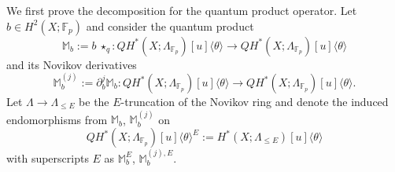 \documentclass[reqno]{amsart}
\numberwithin{equation}{section}
\numberwithin{equation}{section}
\numberwithin{equation}{section}
\theoremstyle{definition}
\theoremstyle{remark}
\theoremstyle{remark}
\begin{document}
We first prove the decomposition for the quantum product operator.  Let $b \in H^2(X;\mathbb{F}_p)$ and consider the quantum product
    \begin{equation}
        \mathbb{M}_b := b \ \star_q : QH^*(X;\Lambda_{\mathbb{F}_p})[u]\langle \theta \rangle \to QH^*(X;\Lambda_{\mathbb{F}_p})[u]\langle \theta \rangle
    \end{equation}
and its Novikov derivatives
\begin{equation}
    \mathbb{M}_b^{(j)} := \partial_b^j \mathbb{M}_b : QH^*(X;\Lambda_{\mathbb{F}_p})[u]\langle \theta \rangle \to QH^*(X;\Lambda_{\mathbb{F}_p})[u]\langle \theta \rangle.
\end{equation}
Let $\Lambda \to \Lambda_{\le E}$ be the $E$-truncation of the Novikov ring and denote the induced endomorphisms from $\mathbb{M}_b$, $\mathbb{M}_b^{(j)}$ on
\begin{equation}
    QH^*(X;\Lambda_{\mathbb{F}_p})[u]\langle \theta \rangle^E := H^*(X;\Lambda_{\le E})[u]\langle \theta \rangle
\end{equation}
with superscripts $E$ as $\mathbb{M}_b^E$, $\mathbb{M}_b^{(j), E}$. 
\end{document}
